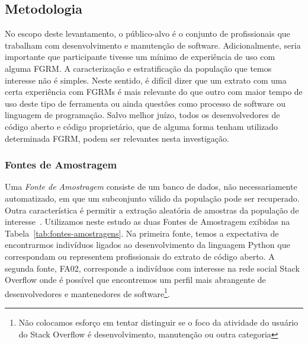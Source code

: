\subsection{Metodologia}
\label{subsec:pesq_metodologias}

No escopo deste levantamento, o público-alvo é o conjunto de profissionais que
trabalham com desenvolvimento e manutenção de software. Adicionalmente, seria
importante que participante tivesse um mínimo de experiência de uso com alguma
FGRM\@. A caracterização e estratificação da população que temos interesse não é
simples. Neste sentido, é difícil dizer que um extrato com uma certa experiência
com FGRMs é mais relevante do que outro com maior tempo de uso deste tipo de
ferramenta ou ainda questões como processo de software ou linguagem de
programação. Salvo melhor juízo, todos os desenvolvedores de código aberto e
código proprietário, que de alguma forma tenham utilizado determinada FGRM,
podem ser relevantes nesta investigação.

\subsubsection{Fontes de Amostragem}
\label{subsubsec:fontes_amostragem}

Uma \textit{Fonte de Amostragem} consiste de um banco de dados, não
necessariamente automatizado, em que um subconjunto válido da população pode ser
recuperado. Outra característica é permitir a extração aleatória de amostras da
população de interesse~\cite{de2014towards}. Utilizamos neste estudo as duas
Fontes de Amostragem exibidas na Tabela~\ref{tab:fontes-amostragens}. Na
primeira fonte, temos a expectativa de encontrarmos indivíduos ligados ao
desenvolvimento da linguagem Python que correspondam ou representem
profissionais do extrato de código aberto. A segunda fonte, FA02, corresponde a
indivíduos com interesse na rede social Stack Overflow onde é possível que
encontremos um perfil mais abrangente de desenvolvedores e mantenedores de
software\footnote{Não colocamos esforço em tentar distinguir se o foco da
    atividade do usuário do Stack Overflow é desenvolvimento, manutenção ou
    outra categoria}.

\begin{table}[htpb]
\centering
{}
\caption{Fontes de Amostragem utilizadas no estudo}
\label{tab:fontes-amostragens}
\end{table}

